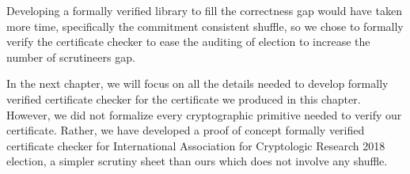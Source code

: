 Developing a formally verified library to fill the correctness gap would have taken more time,
specifically the commitment consistent shuffle, 
so we chose to formally verify the certificate checker to ease the auditing of election to 
increase the number of scrutineers gap. 
 
In the next chapter, we will focus on all the details needed to 
develop formally verified certificate checker for the certificate we produced in this chapter. 
However, we did not 
formalize every cryptographic primitive needed to verify our certificate. Rather, 
we have developed a proof of concept formally verified certificate checker for 
 International Association for Cryptologic Research 2018 election, a simpler 
 scrutiny sheet than ours which does not involve any shuffle. 
